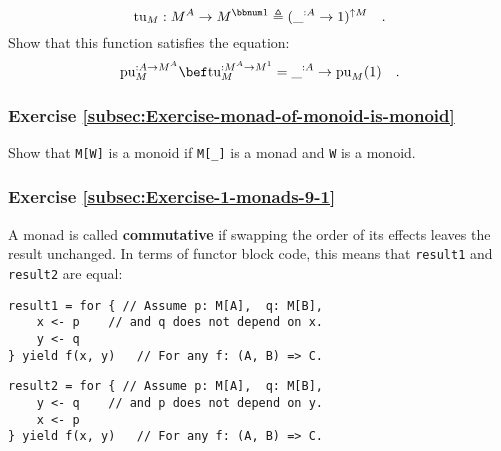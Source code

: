 ~\vspace{-0.9\baselineskip}
\[
\text{tu}_{M}:M^{A}\rightarrow M^{\bbnum 1}\triangleq(\_^{:A}\rightarrow1)^{\uparrow M}\quad.
\]
Show that this function satisfies the equation:
\[
\text{pu}_{M}^{:A\rightarrow M^{A}}\bef\text{tu}_{M}^{:M^{A}\rightarrow M^{1}}=\_^{:A}\rightarrow\text{pu}_{M}(1)\quad.
\]


\subsubsection{Exercise \label{subsec:Exercise-monad-of-monoid-is-monoid}\ref{subsec:Exercise-monad-of-monoid-is-monoid}}

Show that \lstinline!M[W]! is a monoid if \lstinline!M[_]! is a
monad and \lstinline!W! is a monoid.

\subsubsection{Exercise \label{subsec:Exercise-1-monads-9-1}\ref{subsec:Exercise-1-monads-9-1}}

A monad is called \textbf{commutative}
if swapping the order of its effects leaves the result unchanged.
In terms of functor block code, this means that \lstinline!result1!
and \lstinline!result2! are equal:

\noindent \texttt{\textcolor{blue}{\footnotesize{}}}%
\begin{minipage}[c]{0.475\columnwidth}%
\texttt{\textcolor{blue}{\footnotesize{}}}
\begin{lstlisting}
result1 = for { // Assume p: M[A],  q: M[B],
    x <- p    // and q does not depend on x.
    y <- q
} yield f(x, y)   // For any f: (A, B) => C.
\end{lstlisting}
%
\end{minipage}\texttt{\textcolor{blue}{\footnotesize{}\hspace*{\fill}}}%
\begin{minipage}[c]{0.475\columnwidth}%
\texttt{\textcolor{blue}{\footnotesize{}}}
\begin{lstlisting}
result2 = for { // Assume p: M[A],  q: M[B],
    y <- q    // and p does not depend on y.
    x <- p
} yield f(x, y)   // For any f: (A, B) => C.
\end{lstlisting}
%
\end{minipage}{\footnotesize\par}

\noindent \vspace{0\baselineskip}

